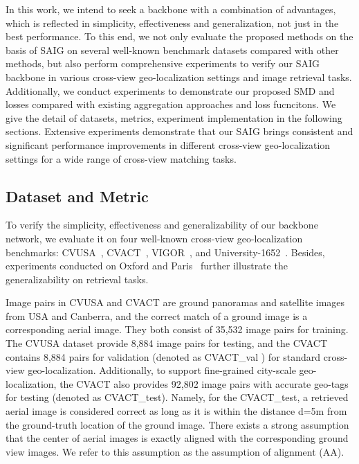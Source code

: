 \documentclass[sn-basic,iicol]{sn-jnl}
\theoremstyle{thmstyletwo}\newtheorem{example}{Example}\newtheorem{remark}{Remark}
\theoremstyle{thmstylethree}\newtheorem{definition}{Definition}
\begin{document}
In this work, we intend to seek a backbone with a combination of advantages, which is reflected in simplicity, effectiveness and generalization, not just in the best performance. To this end, we not only evaluate the proposed methods on the basis of SAIG on several well-known benchmark datasets compared with other methods, but also perform comprehensive experiments to verify our SAIG backbone in various cross-view geo-localization settings and image retrieval tasks. Additionally, we conduct experiments to demonstrate our proposed SMD and losses compared with existing aggregation approaches and loss fucncitons.
We give the detail of datasets, metrics, experiment implementation in the following sections. Extensive experiments demonstrate that our SAIG brings consistent and significant performance improvements in different cross-view geo-localization settings for a wide range of cross-view matching tasks.



\subsection{Dataset and Metric}

To verify the simplicity, effectiveness and generalizability of our backbone network, we evaluate it on four well-known cross-view geo-localization benchmarks: CVUSA~\citep{CVUSA}, CVACT~\citep{liu2019lending}, VIGOR~\citep{VIGOR2021}, and University-1652~\citep{2020University-1652}. Besides, experiments conducted on Oxford and Paris~\citep{RoxfordAndParis} further illustrate the generalizability on retrieval tasks.  



 Image pairs in CVUSA and CVACT are ground panoramas and satellite images from USA and Canberra, and the correct match of a ground image is a corresponding aerial image. They both consist of 35,532 image pairs for training. The CVUSA dataset provide 8,884 image pairs for testing, and the CVACT contains 8,884 pairs for validation (denoted as CVACT\_val ) for standard cross-view geo-localization. Additionally, to support fine-grained city-scale geo-localization, the CVACT also provides 92,802 image pairs with accurate geo-tags for testing (denoted as CVACT\_test). Namely, for the CVACT\_test, a retrieved aerial image is considered correct as long as it is within the distance d=5m from the ground-truth location of the ground image.
There exists a strong assumption that the center of aerial images is exactly aligned with the corresponding ground view images. We refer to this assumption as the assumption of alignment (AA). 
\end{document}
